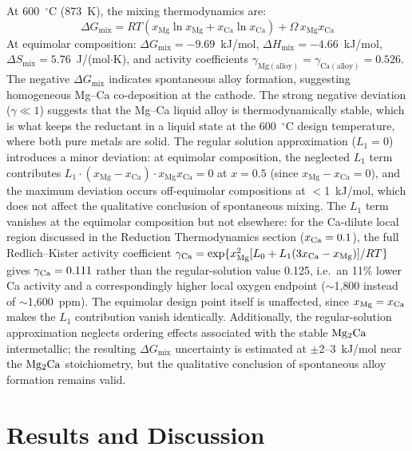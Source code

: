 \documentclass[11pt]{article}
\begin{document}
At 600~$^{\circ}$C (873~K), the mixing thermodynamics are:
\begin{equation}
\label{eq:mix}
\Delta G_{\mathrm{mix}} = RT(x_{\mathrm{Mg}}\ln x_{\mathrm{Mg}} + x_{\mathrm{Ca}}\ln x_{\mathrm{Ca}}) + \Omega\,x_{\mathrm{Mg}}x_{\mathrm{Ca}}
\end{equation}
At equimolar composition: $\Delta G_{\mathrm{mix}} = -9.69$~kJ/mol, $\Delta H_{\mathrm{mix}} = -4.66$~kJ/mol, $\Delta S_{\mathrm{mix}} = 5.76$~J/(mol$\cdot$K), and activity coefficients $\gamma_{\mathrm{Mg(alloy)}} = \gamma_{\mathrm{Ca(alloy)}} = 0.526$. The negative $\Delta G_{\mathrm{mix}}$ indicates spontaneous alloy formation, suggesting homogeneous Mg--Ca co-deposition at the cathode. The strong negative deviation ($\gamma \ll 1$) suggests that the Mg--Ca liquid alloy is thermodynamically stable, which is what keeps the reductant in a liquid state at the 600~$^{\circ}$C design temperature, where both pure metals are solid. The regular solution approximation ($L_1 = 0$) introduces a minor deviation: at equimolar composition, the neglected $L_1$ term contributes $L_1 \cdot (x_{\mathrm{Mg}} - x_{\mathrm{Ca}}) \cdot x_{\mathrm{Mg}} x_{\mathrm{Ca}} = 0$ at $x = 0.5$ (since $x_{\mathrm{Mg}} - x_{\mathrm{Ca}} = 0$), and the maximum deviation occurs off-equimolar compositions at $<$1~kJ/mol, which does not affect the qualitative conclusion of spontaneous mixing. The $L_1$ term vanishes at the equimolar composition but not elsewhere: for the Ca-dilute local region discussed in the Reduction Thermodynamics section ($x_{\ce{Ca}} = 0.1$), the full Redlich--Kister activity coefficient $\gamma_{\ce{Ca}} = \exp\{x_{\ce{Mg}}^2[L_0 + L_1(3x_{\ce{Ca}} - x_{\ce{Mg}})]/RT\}$ gives $\gamma_{\ce{Ca}} = 0.111$ rather than the regular-solution value 0.125, i.e.\ an 11\% lower Ca activity and a correspondingly higher local oxygen endpoint ($\sim$1{,}800 instead of $\sim$1{,}600~ppm). The equimolar design point itself is unaffected, since $x_{\ce{Mg}} = x_{\ce{Ca}}$ makes the $L_1$ contribution vanish identically. Additionally, the regular-solution approximation neglects ordering effects associated with the stable $\ce{Mg2Ca}$ intermetallic; the resulting $\Delta G_{\mathrm{mix}}$ uncertainty is estimated at $\pm$2--3~kJ/mol near the $\ce{Mg2Ca}$ stoichiometry, but the qualitative conclusion of spontaneous alloy formation remains valid.

\section*{Results and Discussion}
\end{document}
